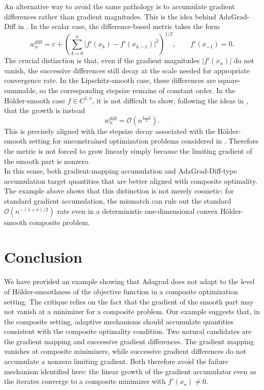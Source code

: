 \documentclass[11pt]{article}
\begin{document}
\noindent
An alternative way to avoid the same pathology is to accumulate gradient differences rather than gradient magnitudes. This is the idea behind AdaGrad-Diff in \citep{bojovic2026adagrad}. In the scalar case, the difference-based metric takes the form
\[
w_{n}^{\mathrm{diff}}
=
\varepsilon+
\left(
\sum_{k=0}^n |f'(x_k)-f'(x_{k-1})|^2
\right)^{1/2},
\qquad
f'(x_{-1})=0.
\]
The crucial distinction is that, even if the gradient magnitudes \(|f'(x_n)|\) do not vanish, the successive differences still decay at the scale needed for appropriate convergence rate. In the Lipschitz-smooth case, these differences are square-summable, so the corresponding stepsize remains of constant order. In the H\"older-smooth case \(f\in C^{1,\nu}\), it is not difficult to show, following the ideas in \citep{bojovic2026adagrad}, that the growth is instead
\[
{w_n^{\mathrm{diff}}}
=
\mathcal O\left(n^{\frac{1-\nu}{2}}\right).
\]
This is precisely aligned with the stepsize decay associated with the H\"older-smooth setting for unconstrained optimization problems considered in \citep{orabona2023normalized}.
Therefore the metric is not forced to grow linearly simply because the limiting gradient of the smooth part is nonzero. \\

\noindent
In this sense, both gradient-mapping accumulation and AdaGrad-Diff-type accumulation target quantities that are better aligned with composite optimality. The example above shows that this distinction is not merely cosmetic: for standard gradient accumulation, the mismatch can rule out the standard \(\mathcal{O}(n^{-(1+\nu)/2})\) rate even in a deterministic one-dimensional convex H\"older-smooth composite problem.

\section{Conclusion}

We have provided an example showing that Adagrad does not adapt to the level of H\"older-smoothness of the objective function in a composite optimization setting.
 The critique relies on the fact that the gradient of the smooth part may not vanish at a  minimizer for a composite problem. 
Our example suggests that, in the composite setting, adaptive mechanisms should accumulate quantities consistent with the composite optimality condition. Two natural candidates are the gradient mapping and successive gradient differences. The gradient mapping vanishes at composite minimizers, while successive gradient differences do not accumulate a nonzero limiting gradient. Both therefore avoid the failure mechanism identified here: the linear growth of the gradient accumulator even as the iterates converge to a composite minimizer with $f'(x_\star)\neq 0$.


\end{document}
